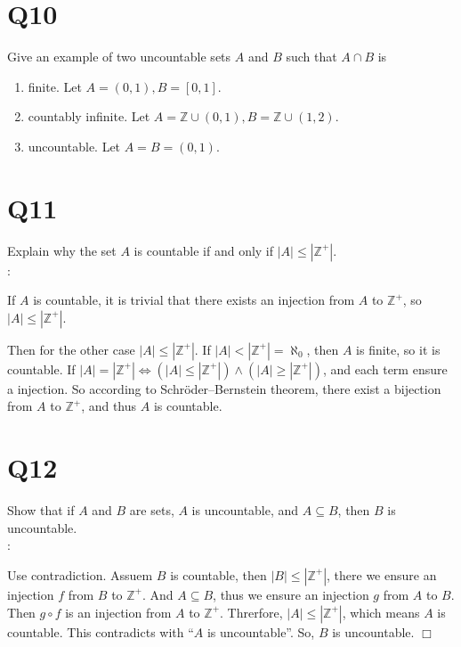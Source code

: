 \documentclass[11pt]{article}
\newenvironment{qparts}{\begin{enumerate}[{(}a{)}]}{\end{enumerate}}
\def\endproofmark{$\Box$}
\newenvironment{proof}{{\bf Proof}:}{\endproofmark\smallskip}
\newenvironment{solution}{{\bf Solution}:}{\smallskip}
\begin{document}
\section*{Q10}
Give an example of two uncountable sets $A$ and $B$ such that
$A \cap B$ is
\begin{qparts}
    
    \item finite. Let $A=(0,1), B=[0,1]$.
    \item countably inﬁnite. 
    Let $A=\mathbb{Z}\cup (0,1), B=\mathbb{Z} \cup (1,2)$.
    
    \item uncountable.
    Let $A=B=(0,1)$.

\end{qparts}

\section*{Q11}
Explain why the set $A$ is countable 
if and only if $\left\vert A \right\vert \le \left\vert \mathbb{Z}^{+} \right\vert $.\\
\begin{solution}

    If $A$ is countable, it is trivial that
    there exists an injection from $A$ to $\mathbb{Z}^{+}$,
    so $\left\vert A \right\vert \le \left\vert \mathbb{Z}^{+} \right\vert $.

    Then for the other case $\left\vert A \right\vert \le \left\vert 
        \mathbb{Z}^{+}
    \right\vert $. If $\left\vert A \right\vert <
    \left\vert \mathbb{Z}^{+} \right\vert=\aleph_0 $, then
    $A$ is finite, so it is countable. If $\left\vert A 
    \right\vert =\left\vert \mathbb{Z}^{+} \right\vert \iff
    (\left\vert A \right\vert \le \left\vert \mathbb{Z}^{+} \right\vert 
    )\land (\left\vert A \right\vert \ge \left\vert \mathbb{Z}^{+} \right\vert )$, and each term ensure a injection. So according to Schröder–Bernstein theorem, there exist a bijection from $A$ to $\mathbb{Z}^{+}$, and thus 
    $A$ is countable.
\end{solution}

\section*{Q12}
Show that if $A$ and $B$ are sets, $A$ is uncountable, and $A \subseteq B$,
then $B$ is uncountable.\\
\begin{proof}

    Use contradiction. Assuem $B$ is countable, then $\left\vert B  \right\vert 
    \le \left\vert \mathbb{Z}^{+} \right\vert $, there we ensure an injection $f$ from $B$ to $\mathbb{Z}^{+}$. And $A \subseteq B$, thus we 
    ensure an injection $g$ from $A$ to $B$. Then $g \circ  f$ is an injection from $A$ to $\mathbb{Z}^{+}$. Threrfore, $\left\vert A  \right\vert \le 
    \left\vert \mathbb{Z}^{+} \right\vert $, which means $A$ is countable.
    This contradicts
    with ``$A$ is uncountable''. So, $B$ is uncountable.
\end{proof}
\end{document}
